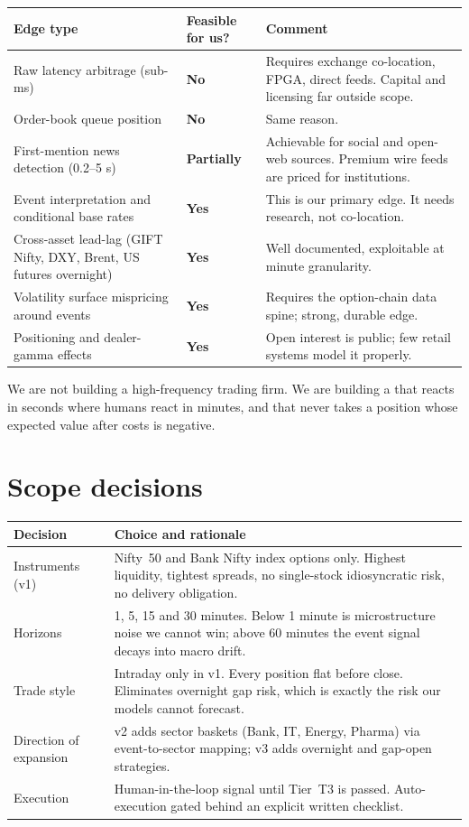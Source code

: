 \begin{longtable}{@{}p{4.2cm}p{4.4cm}p{6.2cm}@{}}
\toprule
\textbf{Edge type} & \textbf{Feasible for us?} & \textbf{Comment}\\
\midrule
Raw latency arbitrage (sub-ms) & \textbf{No} & Requires exchange co-location,
FPGA, direct feeds. Capital and licensing far outside scope.\\
Order-book queue position & \textbf{No} & Same reason.\\
First-mention news detection (0.2--5 s) & \textbf{Partially} & Achievable for
social and open-web sources. Premium wire feeds are priced for institutions.\\
Event interpretation and conditional base rates & \textbf{Yes} & This is our
primary edge. It needs research, not co-location.\\
Cross-asset lead-lag (GIFT Nifty, DXY, Brent, US futures overnight) &
\textbf{Yes} & Well documented, exploitable at minute granularity.\\
Volatility surface mispricing around events & \textbf{Yes} & Requires the
option-chain data spine; strong, durable edge.\\
Positioning and dealer-gamma effects & \textbf{Yes} & Open interest is public;
few retail systems model it properly.\\
\bottomrule
\end{longtable}

\begin{keybox}[title={Strategic conclusion}]
We are not building a high-frequency trading firm. We are building a
 that reacts in
seconds where humans react in minutes, and that never takes a position whose
expected value after costs is negative.
\end{keybox}

\section{Scope decisions}

\begin{longtable}{@{}p{4.0cm}p{10.6cm}@{}}
\toprule
\textbf{Decision} & \textbf{Choice and rationale}\\
\midrule
Instruments (v1) & Nifty~50 and Bank Nifty index options only. Highest
liquidity, tightest spreads, no single-stock idiosyncratic risk, no delivery
obligation.\\
Horizons & 1, 5, 15 and 30 minutes. Below 1 minute is microstructure noise we
cannot win; above 60 minutes the event signal decays into macro drift.\\
Trade style & Intraday only in v1. Every position flat before close. Eliminates
overnight gap risk, which is exactly the risk our models cannot forecast.\\
Direction of expansion & v2 adds sector baskets (Bank, IT, Energy, Pharma) via
event-to-sector mapping; v3 adds overnight and gap-open strategies.\\
Execution & Human-in-the-loop signal until Tier~T3 is passed. Auto-execution
gated behind an explicit written checklist.\\
\bottomrule
\end{longtable}

